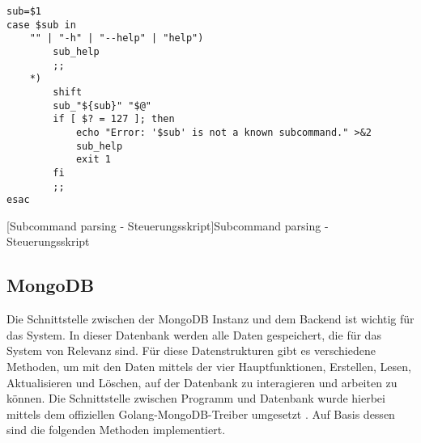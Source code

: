 \begin{verbatim}
sub=$1
case $sub in
	"" | "-h" | "--help" | "help")
		sub_help
		;;
	*)
		shift
		sub_"${sub}" "$@"
		if [ $? = 127 ]; then
			echo "Error: '$sub' is not a known subcommand." >&2
			sub_help
			exit 1
		fi
		;;
esac
\end{verbatim}
[Subcommand parsing - Steuerungsskript]{Subcommand parsing - Steuerungsskript \cite{shgist}}
\label{code:subcommands}

\newpage

\subsection{MongoDB}

Die Schnittstelle zwischen der MongoDB Instanz und dem Backend ist wichtig für das System. In dieser Datenbank werden alle Daten gespeichert, die für das System von Relevanz sind. Für diese Datenstrukturen gibt es verschiedene Methoden, um mit den Daten mittels der vier Hauptfunktionen, Erstellen, Lesen, Aktualisieren und Löschen, auf der Datenbank zu interagieren und arbeiten zu können. Die Schnittstelle zwischen Programm und Datenbank wurde hierbei mittels dem offiziellen Golang-MongoDB-Treiber umgesetzt \cite{mongogo}. Auf Basis dessen sind die folgenden Methoden implementiert.


